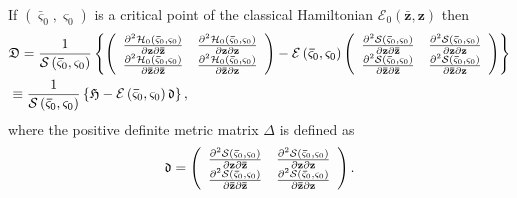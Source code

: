 \documentclass[aps,preprint]{revtex4}%
\begin{document}
If $\left(  \mathbf{\bar{\varsigma}}_{0},\mathbf{\varsigma}_{0}\right)  $ is a
critical point of the classical Hamiltonian $\mathcal{E}_{0}\left(
\mathbf{\bar{z}},\mathbf{z}\right)  $ then
\begin{align}
&  \mathfrak{D}=\frac{1}{\mathcal{S}\left(  \mathbf{\bar{\varsigma}}%
_{0},\mathbf{\varsigma}_{0}\right)  }\left\{  \left(
\begin{array}
[c]{cc}%
\frac{\partial^{2}\mathcal{H}_{0}\left(  \mathbf{\bar{\varsigma}}%
_{0},\mathbf{\varsigma}_{0}\right)  }{\partial\mathbf{z\partial\bar{z}}} &
\frac{\partial^{2}\mathcal{H}_{0}\left(  \mathbf{\bar{\varsigma}}%
_{0},\mathbf{\varsigma}_{0}\right)  }{\partial\mathbf{z\partial z}}\\
\frac{\partial^{2}\mathcal{H}_{0}\left(  \mathbf{\bar{\varsigma}}%
_{0},\mathbf{\varsigma}_{0}\right)  }{\partial\mathbf{\bar{z}\partial\bar{z}}}
& \frac{\partial^{2}\mathcal{H}_{0}\left(  \mathbf{\bar{\varsigma}}%
_{0},\mathbf{\varsigma}_{0}\right)  }{\partial\mathbf{\bar{z}\partial z}}%
\end{array}
\right)  -\mathcal{E}\left(  \mathbf{\bar{\varsigma}}_{0},\mathbf{\varsigma
}_{0}\right)  \left(
\begin{array}
[c]{cc}%
\frac{\partial^{2}\mathcal{S}\left(  \mathbf{\bar{\varsigma}}_{0}%
,\mathbf{\varsigma}_{0}\right)  }{\partial\mathbf{z\partial\bar{z}}} &
\frac{\partial^{2}\mathcal{S}\left(  \mathbf{\bar{\varsigma}}_{0}%
,\mathbf{\varsigma}_{0}\right)  }{\partial\mathbf{z\partial z}}\\
\frac{\partial^{2}\mathcal{S}\left(  \mathbf{\bar{\varsigma}}_{0}%
,\mathbf{\varsigma}_{0}\right)  }{\partial\mathbf{\bar{z}\partial\bar{z}}} &
\frac{\partial^{2}\mathcal{S}\left(  \mathbf{\bar{\varsigma}}_{0}%
,\mathbf{\varsigma}_{0}\right)  }{\partial\mathbf{\bar{z}\partial z}}%
\end{array}
\right)  \right\} \nonumber\\
&  \equiv\frac{1}{\mathcal{S}\left(  \mathbf{\bar{\varsigma}}_{0}%
,\mathbf{\varsigma}_{0}\right)  }\left\{  \mathfrak{H}-\mathcal{E}\left(
\mathbf{\bar{\varsigma}}_{0},\mathbf{\varsigma}_{0}\right)  \mathfrak{\Delta
}\right\}  ,
\end{align}
where the positive definite metric matrix $\mathfrak{\Delta}$ is defined as
\begin{equation}
\mathfrak{\Delta}=\left(
\begin{array}
[c]{cc}%
\frac{\partial^{2}\mathcal{S}\left(  \mathbf{\bar{\varsigma}}_{0}%
,\mathbf{\varsigma}_{0}\right)  }{\partial\mathbf{z\partial\bar{z}}} &
\frac{\partial^{2}\mathcal{S}\left(  \mathbf{\bar{\varsigma}}_{0}%
,\mathbf{\varsigma}_{0}\right)  }{\partial\mathbf{z\partial z}}\\
\frac{\partial^{2}\mathcal{S}\left(  \mathbf{\bar{\varsigma}}_{0}%
,\mathbf{\varsigma}_{0}\right)  }{\partial\mathbf{\bar{z}\partial\bar{z}}} &
\frac{\partial^{2}\mathcal{S}\left(  \mathbf{\bar{\varsigma}}_{0}%
,\mathbf{\varsigma}_{0}\right)  }{\partial\mathbf{\bar{z}\partial z}}%
\end{array}
\right)  .
\end{equation}
\end{document}
